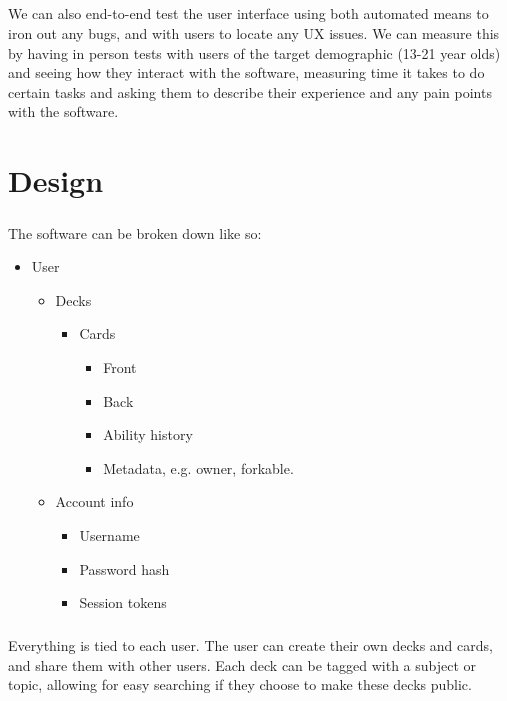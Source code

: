 \documentclass{report}
\begin{document}
\paragraph{}
We can also end-to-end test the user interface using both automated means to iron out any bugs, and with users to locate any UX issues. We can measure this by having in person tests with users of the target demographic (13-21 year olds) and seeing how they interact with the software, measuring time it takes to do certain tasks and asking them to describe their experience and any pain points with the software.

\chapter{Design}
\paragraph{}
The software can be broken down like so:

\begin{itemize}
  \item User \begin{itemize}
    \item Decks \begin{itemize}
      \item Cards \begin{itemize}
        \item Front
        \item Back
        \item Ability history
        \item Metadata, e.g. owner, forkable.
      \end{itemize}
    \end{itemize}
    \item Account info \begin{itemize}
      \item Username
      \item Password hash
      \item Session tokens
    \end{itemize}
  \end{itemize}
\end{itemize}

\paragraph{}
Everything is tied to each user. The user can create their own decks and cards, and share them with other users. Each deck can be tagged with a subject or topic, allowing for easy searching if they choose to make these decks public.
\end{document}
